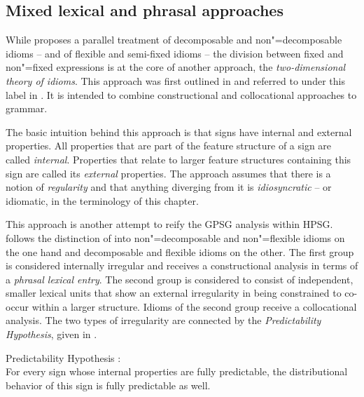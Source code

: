 \documentclass[output=paper
                ,modfonts
                ,nonflat
	        ,collection
	        ,collectionchapter
	        ,collectiontoclongg
 	        ,biblatex
                ,babelshorthands
                ,newtxmath
                ,draftmode
                ,colorlinks, citecolor=brown
]{./langsci/langscibook}
\begin{document}
\subsection{Mixed lexical and phrasal approaches}
\label{Sec-Mixed}

While \citet{Riehemann2001a} proposes a parallel treatment of decomposable and non"=decomposable idioms -- and of flexible and semi-fixed idioms -- the division between fixed and non"=fixed expressions is at the core of another approach, the \emph{two-dimensional theory of idioms}. This approach was first outlined in \citet{Sailer2000a} and referred to under this label in \citet{Richter:Sailer:09,Richter:Sailer:14}. It is intended to combine constructional and collocational approaches to grammar.

The basic intuition behind this approach is that signs have internal and external properties. 
All properties that are part of the feature structure of a sign are called \emph{internal}. 
Properties that relate to larger feature structures containing this sign are called its \emph{external} properties. 
The approach assumes that there is a notion of \emph{regularity} and that anything diverging from it is \emph{idiosyncratic} -- or idiomatic, in the terminology of this chapter. 

This approach is another attempt to reify the GPSG analysis within HPSG.
\citet{Sailer2000a} follows the distinction of \citet{NSW94a} into non"=decomposable and non"=flexible idioms on the one hand and decomposable and flexible idioms on the other. The first group is considered internally irregular and receives a constructional analysis in terms of a \emph{phrasal lexical entry}. The second group is considered to consist of independent, smaller lexical units that show an external irregularity in being constrained to co-occur within a larger structure. 
Idioms of the second group receive a collocational analysis. The two types of irregularity are connected by the  \emph{Predictability Hypothesis}, given in .

\ea Predictability Hypothesis \citep[]{Sailer2000a}:\label{PredHypo}\\
For every sign whose internal properties are fully predictable, the distributional
behavior of this sign is fully predictable as well.
\z 
\end{document}
